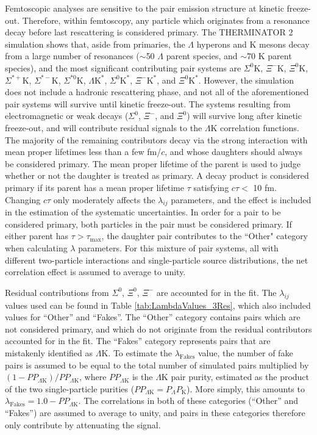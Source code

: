 \documentclass[ALICE,manyauthors]{cernphprep}
\newcommand{\Lam}{$\Lambda$\xspace}
\newcommand{\LamK}{$\Lambda$K\xspace}
\begin{document}
Femtoscopic analyses are sensitive to the pair emission structure at kinetic freeze-out.
Therefore, within femtoscopy, any particle which originates from a resonance decay before last rescattering is considered primary.
The THERMINATOR 2 simulation shows that, aside from primaries, the \Lam hyperons and K mesons decay from a large number of resonances ($\sim$50 \Lam parent species, and $\sim$70 K parent species), and the most significant contributing pair systems are $\Sigma^{0}$K, $\Xi^{-}$K, $\Xi^{0}$K, $\Sigma^{*+}$K, $\Sigma^{*-}$K, $\Sigma^{*0}$K, $\Lambda\mathrm{K}^{*}$, $\Sigma^{0}\mathrm{K}^{*}$, $\Xi^{-}\mathrm{K}^{*}$, and $\Xi^{0}\mathrm{K}^{*}$.
However, the simulation does not include a hadronic rescattering phase, and not all of the aforementioned pair systems will survive until kinetic freeze-out.
The systems resulting from electromagnetic or weak decays ($\Sigma^{0}$, $\Xi^{-}$, and $\Xi^{0}$) will survive long after kinetic freeze-out, and will contribute residual signals to the \LamK correlation functions.
The majority of the remaining contributors decay via the strong interaction with mean proper lifetimes less than a few fm/$c$, and whose daughters should always be considered primary.
The mean proper lifetime of the parent is used to judge whether or not the daughter is treated as primary.
A decay product is considered primary if its parent has a mean proper lifetime $\tau$ satisfying $c\tau <$ 10 fm.
Changing $c\tau$ only moderately affects the $\lambda_{ij}$ parameters, and the effect is included in the estimation of the systematic uncertainties.
In order for a pair to be considered primary, both particles in the pair must be considered primary. 
If either parent has $\tau > \tau_{\mathrm{max}}$, the daughter pair contributes to the ``Other" category when calculating $\lambda$ parameters.
For this mixture of pair systems, all with different two-particle interactions and single-particle source distributions, the net correlation effect is assumed to average to unity.


Residual contributions from $\Sigma^{0}$, $\Xi^{0}$, $\Xi^{-}$ are accounted for in the fit.
The $\lambda_{ij}$ values used can be found in Table \ref{tab:LambdaValues_3Res}, which also included values for ``Other'' and ``Fakes''.  
The ``Other'' category contains pairs which are not considered primary, and which do not originate from the residual contributors accounted for in the fit.  
The ``Fakes'' category represents pairs that are mistakenly identified as \LamK.  
To estimate the $\lambda_{\mathrm{Fakes}}$ value, the number of fake pairs is assumed to be equal to the total number of simulated pairs multiplied by $(1-PP_{\Lambda\mathrm{K}})/PP_{\Lambda\mathrm{K}}$, where $PP_{\Lambda\mathrm{K}}$ is the \LamK pair purity, estimated as the product of the two single-particle purities ($PP_{\Lambda\mathrm{K}} = P_{\Lambda}P_{\mathrm{K}}$).
More simply, this amounts to $\lambda_{\mathrm{Fakes}} = 1.0-PP_{\Lambda\mathrm{K}}$.
The correlations in both of these categories (``Other'' and ``Fakes'') are assumed to average to unity, and pairs in these categories therefore only contribute by attenuating the signal. 
\end{document}
